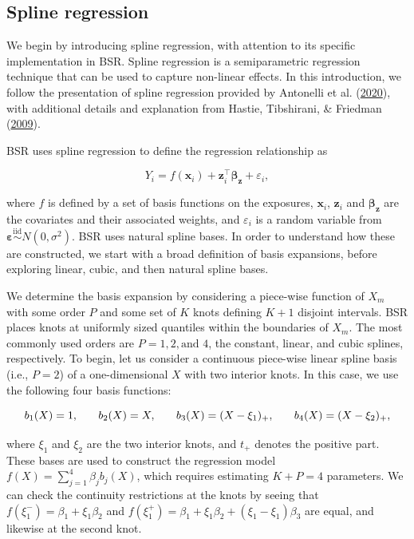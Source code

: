 \documentclass[12pt, twoside]{amherstthesis}
\begin{document}
\hypertarget{spline-regression}{%
\subsection{Spline regression}\label{spline-regression}}

We begin by introducing spline regression, with attention to its specific implementation in BSR. Spline regression is a semiparametric regression technique that can be used to capture non-linear effects. In this introduction, we follow the presentation of spline regression provided by Antonelli et al. (\protect\hyperlink{ref-antonelli_estimating_2020}{2020}), with additional details and explanation from Hastie, Tibshirani, \& Friedman (\protect\hyperlink{ref-hastie_elements_2009}{2009}).

BSR uses spline regression to define the regression relationship as

\[
Y_i = f(\textbf{x}_i) + \textbf{z}_i^\top \boldsymbol{\beta}_{\textbf{z}} +\varepsilon_i,
\]

\noindent where \(f\) is defined by a set of basis functions on the exposures, \(\textbf{x}_i\), \(\textbf{z}_i\) and \(\boldsymbol{\beta}_{\textbf{z}}\) are the covariates and their associated weights, and \(\varepsilon_i\) is a random variable from \(\boldsymbol\varepsilon \overset{\mathrm{iid}}{\sim} N(0, \sigma^2)\). BSR uses natural spline bases. In order to understand how these are constructed, we start with a broad definition of basis expansions, before exploring linear, cubic, and then natural spline bases.

We determine the basis expansion by considering a piece-wise function of \(X_m\) with some order \(P\) and some set of \(K\) knots defining \(K+1\) disjoint intervals. BSR places knots at uniformly sized quantiles within the boundaries of \(X_m\). The most commonly used orders are \(P=1,2,\textrm{and } 4\), the constant, linear, and cubic splines, respectively. To begin, let us consider a continuous piece-wise linear spline basis (i.e., \(P=2\)) of a one-dimensional \(X\) with two interior knots. In this case, we use the following four basis functions:

\nointerlineskip

\[
b_1(X)=1, \hspace{0.25in} b_2(X)=X, \hspace{0.25in} b_3(X)=(X-\xi_1)_+, \hspace{0.25in} b_4(X)=(X-\xi_2)_+,
\]

\noindent where \(\xi_1\) and \(\xi_2\) are the two interior knots, and \(t_+\) denotes the positive part. These bases are used to construct the regression model \(f(X)=\sum_{j=1}^4\beta_jb_j(X)\), which requires estimating \(K+P=4\) parameters. We can check the continuity restrictions at the knots by seeing that \(f(\xi_1^-)=\beta_1 + \xi_1\beta_2\) and \(f(\xi_1^+)= \beta_1 + \xi_1\beta_2+ (\xi_1-\xi_1)\beta_3\) are equal, and likewise at the second knot.
\end{document}
